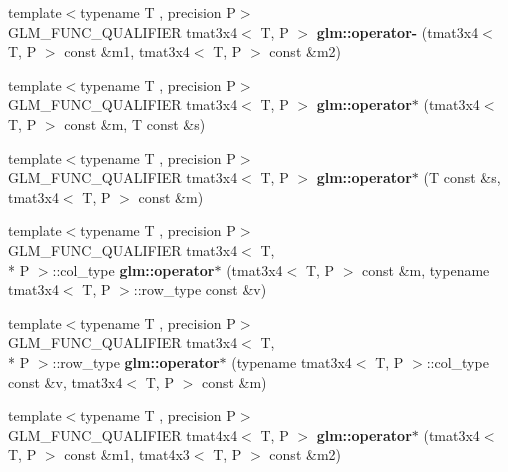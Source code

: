 \begin{DoxyCompactItemize}
\item 
\hypertarget{namespaceglm_a6349098541c329f41e900eaf05eca9f7}{{\footnotesize template$<$typename T , precision P$>$ }\\G\-L\-M\-\_\-\-F\-U\-N\-C\-\_\-\-Q\-U\-A\-L\-I\-F\-I\-E\-R tmat3x4$<$ T, P $>$ {\bfseries glm\-::operator-\/} (tmat3x4$<$ T, P $>$ const \&m1, tmat3x4$<$ T, P $>$ const \&m2)}\label{namespaceglm_a6349098541c329f41e900eaf05eca9f7}

\item 
\hypertarget{namespaceglm_aaf5572f712e92e26492087bb211a8c55}{{\footnotesize template$<$typename T , precision P$>$ }\\G\-L\-M\-\_\-\-F\-U\-N\-C\-\_\-\-Q\-U\-A\-L\-I\-F\-I\-E\-R tmat3x4$<$ T, P $>$ {\bfseries glm\-::operator$\ast$} (tmat3x4$<$ T, P $>$ const \&m, T const \&s)}\label{namespaceglm_aaf5572f712e92e26492087bb211a8c55}

\item 
\hypertarget{namespaceglm_a213530885c50991995510cb716206848}{{\footnotesize template$<$typename T , precision P$>$ }\\G\-L\-M\-\_\-\-F\-U\-N\-C\-\_\-\-Q\-U\-A\-L\-I\-F\-I\-E\-R tmat3x4$<$ T, P $>$ {\bfseries glm\-::operator$\ast$} (T const \&s, tmat3x4$<$ T, P $>$ const \&m)}\label{namespaceglm_a213530885c50991995510cb716206848}

\item 
\hypertarget{namespaceglm_acfc37201cc87201be4ee62163b920f60}{{\footnotesize template$<$typename T , precision P$>$ }\\G\-L\-M\-\_\-\-F\-U\-N\-C\-\_\-\-Q\-U\-A\-L\-I\-F\-I\-E\-R tmat3x4$<$ T, \\*
P $>$\-::col\-\_\-type {\bfseries glm\-::operator$\ast$} (tmat3x4$<$ T, P $>$ const \&m, typename tmat3x4$<$ T, P $>$\-::row\-\_\-type const \&v)}\label{namespaceglm_acfc37201cc87201be4ee62163b920f60}

\item 
\hypertarget{namespaceglm_a07073085876a06ecf12abfa2cea3c054}{{\footnotesize template$<$typename T , precision P$>$ }\\G\-L\-M\-\_\-\-F\-U\-N\-C\-\_\-\-Q\-U\-A\-L\-I\-F\-I\-E\-R tmat3x4$<$ T, \\*
P $>$\-::row\-\_\-type {\bfseries glm\-::operator$\ast$} (typename tmat3x4$<$ T, P $>$\-::col\-\_\-type const \&v, tmat3x4$<$ T, P $>$ const \&m)}\label{namespaceglm_a07073085876a06ecf12abfa2cea3c054}

\item 
\hypertarget{namespaceglm_a2e36bbd84745c2cd6dee14d589a152dc}{{\footnotesize template$<$typename T , precision P$>$ }\\G\-L\-M\-\_\-\-F\-U\-N\-C\-\_\-\-Q\-U\-A\-L\-I\-F\-I\-E\-R tmat4x4$<$ T, P $>$ {\bfseries glm\-::operator$\ast$} (tmat3x4$<$ T, P $>$ const \&m1, tmat4x3$<$ T, P $>$ const \&m2)}\label{namespaceglm_a2e36bbd84745c2cd6dee14d589a152dc}


\end{DoxyCompactItemize}
